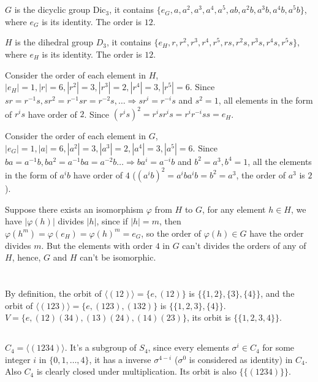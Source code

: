 \documentclass[12pt]{article}
\begin{document}
\section{}
$G$ is the dicyclic group $\mathrm{Dic}_3$, it contains $\{e_G,a,a^2,a^3,a^4,a^5,ab,a^2b,a^3b,a^4b,a^5b\}$, where $e_G$ is its identity. The order is $12$.

$H$ is the dihedral group $D_3$, it contains $\{e_H, r,r^2,r^3,r^4,r^5,rs,r^2s,r^3s,r^4s,r^5s\}$, where $e_H$ is its identity. The order is $12$.

Consider the order of each element in $H$, $|e_H|=1,|r|=6,|r^2|=3,|r^3|=2,|r^4|=3,|r^5|=6$. Since $sr=r^{-1}s, sr^2=r^{-1}sr=r^{-2}s,\dots\Rightarrow sr^{i}=r^{-i}s$ and $s^2=1$, all elements in the form of $r^is$ have order of $2$. Since $(r^is)^2=r^isr^is=r^ir^{-i}ss=e_H$.

Consider the order of each element in $G$, $|e_G|=1,|a|=6,|a^2|=3,|a^3|=2,|a^4|=3,|a^5|=6$. Since $ba=a^{-1}b, ba^2=a^{-1}ba=a^{-2}b\dots\Rightarrow ba^{i}=a^{-i}b$ and $b^2=a^3,b^4=1$, all the elements in the form of $a^ib$ have order of $4$ ($(a^ib)^2=a^iba^ib=b^2=a^3$, the order of $a^3$ is $2$).

Suppose there exists an isomorphism $\varphi$ from $H$ to $G$, for any element $h\in H$, we have $|\varphi(h)|$ divides $|h|$, since if $|h|=m$, then $\varphi(h^m)=\varphi(e_H)=\varphi(h)^m=e_G$, so the order of $\varphi(h)\in G$ have the order divides $m$. But the elements with order $4$ in $G$ can't divides the orders of any of $H$, hence, $G$ and $H$ can't be isomorphic.

\section{}
\subsection{}
By definition, the orbit of $\langle (12)\rangle=\{e,(12)\}$ is $\{\{1,2\},\{3\},\{4\}\}$, and the orbit of $\langle (123)\rangle=\{e,(123),(132)\}$ is $\{\{1,2,3\},\{4\}\}$. $V=\{e,(12)(34),(13)(24),(14)(23)\}$, its orbit is $\{\{1,2,3,4\}\}$.

\subsection{}
$C_4=\langle (1234)\rangle$. It's a subgroup of $S_4$, since every elements $\sigma^i\in C_4$ for some integer $i$ in $\{0,1,\dots,4\}$, it has a inverse $\sigma^{4-i}$ ($\sigma^0$ is considered as identity) in $C_4$. Also $C_4$ is clearly closed under multiplication. Its orbit is also $\{\{(1234)\}\}$.
\end{document}
